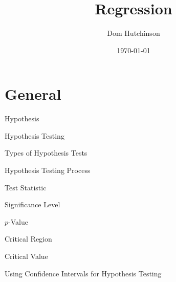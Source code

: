 \documentclass[11pt,a4paper]{article}
\begin{document}
\title{Regression}
\author{Dom Hutchinson}
\date{\today}
\maketitle

\section{General}

\begin{definition}{Hypothesis}
\end{definition}

\begin{definition}{Hypothesis Testing}
\end{definition}

\begin{remark}{Types of Hypothesis Tests}

\end{remark}

\begin{proposition}{Hypothesis Testing Process}

\end{proposition}

\begin{definition}{Test Statistic}
\end{definition}

\begin{definition}{Significance Level}

\end{definition}

\begin{definition}{$p$-Value}

\end{definition}

\begin{definition}{Critical Region}

\end{definition}

\begin{definition}{Critical Value}

\end{definition}

\begin{remark}{Using Confidence Intervals for Hypothesis Testing}
\end{remark}
\end{document}
